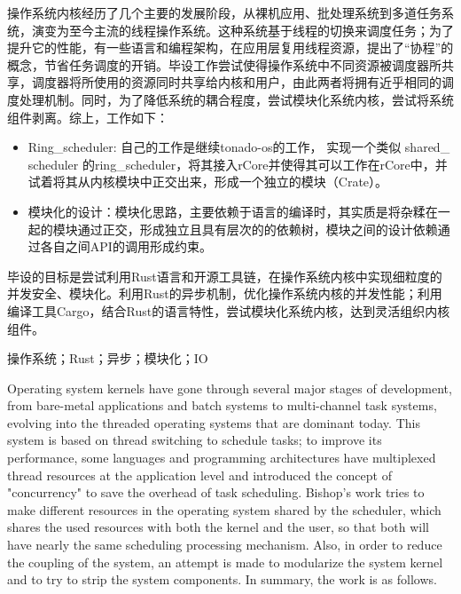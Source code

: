 \setlength{\headheight}{1.5cm}

\abstractcn


操作系统内核经历了几个主要的发展阶段，从裸机应用、批处理系统到多道任务系统，演变为至今主流的线程操作系统。这种系统基于线程的切换来调度任务；为了提升它的性能，有一些语言和编程架构，在应用层复用线程资源，提出了“协程”的概念，节省任务调度的开销。毕设工作尝试使得操作系统中不同资源被调度器所共享，调度器将所使用的资源同时共享给内核和用户，由此两者将拥有近乎相同的调度处理机制。同时，为了降低系统的耦合程度，尝试模块化系统内核，尝试将系统组件剥离。综上，工作如下：

\begin{itemize}
\item Ring\_scheduler: 自己的工作是继续tonado-os的工作， 实现一个类似 shared\_ scheduler 的ring\_scheduler，将其接入rCore并使得其可以工作在rCore中，并试着将其从内核模块中正交出来，形成一个独立的模块（Crate）。 

\item 模块化的设计：模块化思路，主要依赖于语言的编译时，其实质是将杂糅在一起的模块通过正交，形成独立且具有层次的的依赖树，模块之间的设计依赖通过各自之间API的调用形成约束。
\end{itemize}


毕设的目标是尝试利用Rust语言和开源工具链，在操作系统内核中实现细粒度的并发安全、模块化。利用Rust的异步机制，优化操作系统内核的并发性能；利用编译工具Cargo，结合Rust的语言特性，尝试模块化系统内核，达到灵活组织内核组件。

\keywordscn\quad 操作系统；Rust；异步；模块化；IO
\abstracten

Operating system kernels have gone through several major stages of development, from bare-metal applications and batch systems to multi-channel
task systems, evolving into the threaded operating systems that are dominant today. This system is based on thread switching to schedule tasks; to improve its performance, some languages and programming architectures have multiplexed thread resources at the application level and introduced the concept of "concurrency" to save the overhead of task scheduling. Bishop's work tries to make different resources in the operating system shared by the scheduler, which shares the used resources with both the kernel and the user, so that both will have nearly the same scheduling processing mechanism. Also, in order to reduce the coupling of the system, an attempt is made to modularize the system kernel and to try to strip the system components. In summary, the work is as follows.

